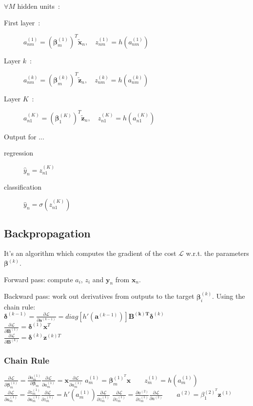 \documentclass[10pt,a4paper,landscape]{article}
\renewcommand{\bf}[1]{\ensuremath{\mathbf{#1}}}
\newcommand{\bbeta}{\boldsymbol\beta}
\newcommand{\bdelta}{\boldsymbol\delta}
\begin{document}
\begin{multicols*}{4}
$\forall M$ hidden units~:
\begin{description}
\item[First layer~:] $a_{nm}^{(1)} = (\bbeta_m^{(1)})^T\tilde{\bf{x}}_n, \quad z_{nm}^{(1)} = h(a_{nm}^{(1)})$
\item[Layer $k$~:] $a_{nm}^{(k)} = (\bbeta_m^{(k)})^T\tilde{\bf{z}}_n, \quad z_{nm}^{(k)} = h(a_{nm}^{(k)})$
\item[Layer $K$~:] $a_{n1}^{(K)} = (\bbeta_1^{(K)})^T\tilde{\bf{z}}_n, \quad z_{n1}^{(K)} = h(a_{n1}^{(K)})$
\end{description}
Output for ...
\begin{description}
\item[regression] $\hat{y}_n = z_{n1}^{(K)}$
\item[classification] $\hat{y}_n = \sigma(z_{n1}^{(K)})$
\end{description}


\subsection{Backpropagation}
It's an algorithm which computes the gradient of the cost $\mathcal{L}$ w.r.t. the parameters $\bbeta^{(k)}$.

Forward pass: compute $a_i$, $z_i$ and $\bf{y}_n$ from $\bf{x}_n$.

Backward pass: work out derivatives from outputs to the target $\bbeta_i^{(k)}$. Using the chain rule:\\
$\bdelta^{(k-1)} = \frac{\partial \mathcal{L}}{\partial \bf{a}^{(k-1)}} = diag[ h'(\bf{a}^{(k-1)}) ] \bf{B^{(k)T}} \bdelta^{(k)}$\\
$\frac{\partial \mathcal{L}}{\partial \bf{B}^{(1)}} = \bdelta^{(1)} \bf{x}^T$\\
$\frac{\partial \mathcal{L}}{\partial \bf{B}^{(k)}} = \bdelta^{(k)} \bf{z}^{(k)T}$

\subsubsection{Chain Rule}
$\frac{\partial\mathcal{L}}{\partial\bbeta_m^{(1)}} = \frac{\partial a_m^{(1)}}{\partial\bbeta_m} \frac{\partial\mathcal{L}}{\partial a_m^{(1)}} = \bf{x} \frac{\partial\mathcal{L}}{\partial a_m^{(1)}}$
$a_m^{(1)} = \bbeta_m^{{(1)}^T} \bf{x} \qquad z_m^{(1)} = h(a_m^{(1)})$
$\frac{\partial\mathcal{L}}{\partial a_m^{(1)}} = \frac{\partial z_m^{(1)}}{\partial a_m^{(1)}} \frac{\partial\mathcal{L}}{\partial z_m^{(1)}} = h'(a_m^{(1)}) \frac{\partial\mathcal{L}}{\partial z_m^{(1)}}$
$\frac{\partial\mathcal{L}}{\partial z_m^{(1)}} = \frac{\partial a^{(2)}}{\partial z_m^{(1)}} \frac{\partial\mathcal{L}}{\partial a^{(2)}} \qquad a^{(2)} = \beta_1^{{(2)}^T}\bf{z}^{(1)}$


\end{multicols*}
\end{document}
